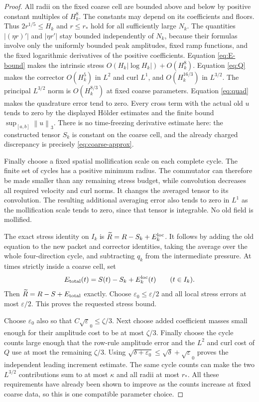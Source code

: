 \documentclass[11pt]{article}
\theoremstyle{remark}\newtheorem{remark}[theorem]{Remark}
\newcommand{\norm}[2]{\left\|#1\right\|_{#2}}
\begin{document}
\begin{proof}
All radii on the fixed coarse cell are bounded above and below by positive
constant multiples of $H_k^8$.
The constants may depend on its coefficients and floors.
Thus $2r^{1/5}\leq H_k$ and $r\leq r_*$ hold for all sufficiently large $N_k$.
The quantities $|(\eta r)'|$ and $|\eta r'|$ stay bounded independently
of $N_k$, because their formulas involve only the uniformly bounded peak amplitudes, fixed
ramp functions, and the fixed logarithmic derivatives of the positive coefficients.
Equation \eqref{eq:E-bound} makes the intrinsic stress
$O(H_k|\log H_k|)+O(H_k^8)$.
Equation \eqref{eq:Q} makes the corrector $O(H_k^5)$ in $L^2$ and
curl $L^1$, and $O(H_k^{16/3})$ in $L^{3/2}$.
The principal $L^{3/2}$ norm is $O(H_k^{8/3})$ at fixed coarse parameters.
Equation \eqref{eq:quad} makes the quadrature error tend to zero.
Every cross term with the actual old $u$ tends to zero by the displayed
Hölder estimates and the finite bound $\sup_{[a,b]}\norm u3$.
There is no time-freezing derivative estimate here: the constructed tensor
$S_k$ is constant on the coarse cell, and the already charged discrepancy
is precisely \eqref{eq:coarse-approx}.

Finally choose a fixed spatial mollification scale on each complete cycle.
The finite set of cycles has a positive minimum radius.
The commutator can therefore be made smaller than any remaining stress budget,
while convolution decreases all required velocity and curl norms.
It changes the averaged tensor to its convolution.
The resulting additional averaging error also tends to zero in $L^1$ as
the mollification scale tends to zero, since that tensor is integrable.
No old field is mollified.

The exact stress identity on $I_k$ is
$\widetilde R=R-S_k+E_k^{\rm loc}$.
It follows by adding the old equation to the new packet and corrector
identities, taking the average over the whole four-direction cycle, and
subtracting $q_k$ from the intermediate pressure.
At times strictly inside a coarse cell, set
\[
 E_{\rm total}(t)=S(t)-S_k+E_k^{\rm loc}(t)\qquad(t\in I_k).
\]
Then $\widetilde R=R-S+E_{\rm total}$ exactly.
Choose $\varepsilon_0\leq\varepsilon/2$ and all local stress errors at most
$\varepsilon/2$.
This proves the requested stress bound.

Choose $\varepsilon_0$ also so that $C\sqrt\varepsilon_0\leq\zeta/3$.
Next choose added coefficient masses small enough for their amplitude cost
to be at most $\zeta/3$.
Finally choose the cycle counts large enough that the row-rule amplitude
error and the $L^2$ and curl cost of $Q$ use at most the remaining $\zeta/3$.
Using $\sqrt{\delta+\varepsilon_0}\leq\sqrt\delta+\sqrt\varepsilon_0$ proves
the independent leading increment estimate.
The same cycle counts can make the two $L^{3/2}$ contributions sum to at
most $\kappa$ and all radii at most $r_*$.
All these requirements have already been shown to improve as the counts
increase at fixed coarse data, so this is one compatible parameter choice.


\end{proof}
\end{document}
